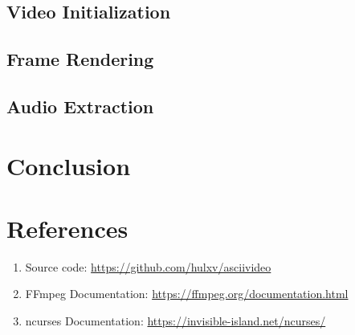 \documentclass[a4paper,12pt]{article}
\begin{document}
\subsection{Video Initialization}

\subsection{Frame Rendering}

\subsection{Audio Extraction}




\section{Conclusion}

\section*{References}
\begin{enumerate}
    \item Source code: \url{https://github.com/hulxv/asciivideo}
    \item FFmpeg Documentation: \url{https://ffmpeg.org/documentation.html}
    \item ncurses Documentation: \url{https://invisible-island.net/ncurses/}
\end{enumerate}
\end{document}
